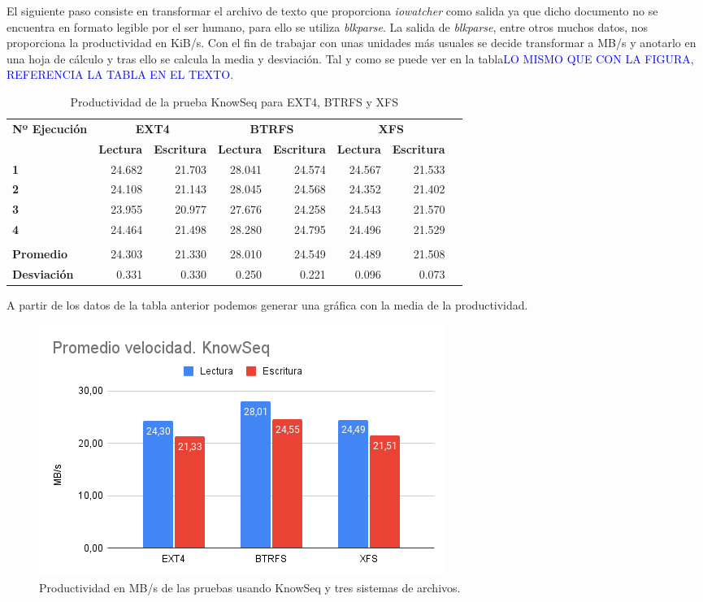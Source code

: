 El siguiente paso consiste en transformar el archivo de texto que proporciona \textit{iowatcher} como salida ya que dicho documento no se encuentra en formato legible por el ser humano, para ello se utiliza \textit{blkparse}. La salida de \textit{blkparse}, entre otros muchos datos, nos proporciona la productividad en KiB/s. Con el fin de trabajar con unas unidades más usuales se decide transformar a MB/s y anotarlo en una hoja de cálculo y tras ello se calcula la media y desviación. Tal y como se puede ver en la tabla\textcolor{blue}{LO MISMO QUE CON LA FIGURA, REFERENCIA LA TABLA EN EL TEXTO}.

\begin{table}[H]\centering 
\caption{Productividad de la prueba KnowSeq para EXT4, BTRFS y XFS} 
\scriptsize
\begin{tabular}{lrrrrrrr}\toprule
\textbf{Nº Ejecución} &\multicolumn{2}{c}{\textbf{EXT4}} &\multicolumn{2}{c}{\textbf{BTRFS}} &\multicolumn{2}{c}{\textbf{XFS}} \\\cmidrule{1-7}
&\textbf{Lectura} &\textbf{Escritura} &\textbf{Lectura} &\textbf{Escritura} &\textbf{Lectura} &\textbf{Escritura} \\\midrule
\textbf{1} &24.682 &21.703 &28.041 &24.574 &24.567 &21.533 \\
\textbf{2} &24.108 &21.143 &28.045 &24.568 &24.352 &21.402 \\
\textbf{3} &23.955 &20.977 &27.676 &24.258 &24.543 &21.570 \\
\textbf{4} &24.464 &21.498 &28.280 &24.795 &24.496 &21.529 \\
\textbf{} & & & & & & \\
\textbf{Promedio} &24.303 &21.330 &28.010 &24.549 &24.489 &21.508 \\
\textbf{Desviación} &0.331 &0.330 &0.250 &0.221 &0.096 &0.073 \\
\bottomrule
\end{tabular}
\end{table}
A partir de los datos de la tabla anterior podemos generar una gráfica con la media de la productividad.

\begin{figure}[H] 
    \centering
    \includegraphics[scale=0.6]{doc/assets/images/Capitulo4/Knowseq/promknow.png}
    \caption{Productividad en MB/s de las pruebas usando KnowSeq y tres sistemas de archivos.}
    \label{aa}
\end{figure}

